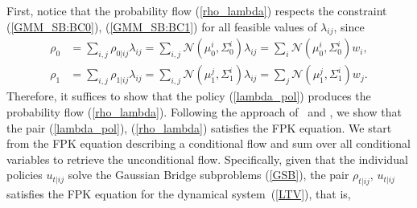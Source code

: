 \documentclass[twoside]{article}
\renewcommand{\eqref}[1]{(\ref{#1})}
\newcommand{\N}{\mathcal{N}}
\begin{document}
First, notice that the probability flow \eqref{rho_lambda} respects the constraint \eqref{GMM_SB:BC0}, \eqref{GMM_SB:BC1} for all feasible values of $\lambda_{ij}$, since 
\begin{subequations}
\begin{align}
    \rho_0 &= \sum_{i,j} \rho_{0|ij} \lambda_{ij} = \sum_{i,j} \N(\mu^i_0, \Sigma_0^i) \lambda_{ij} = \sum_{i} \N(\mu^i_0, \Sigma_0^i) w_i,\\
    \rho_1 &= \sum_{i,j} \rho_{1|ij} \lambda_{ij} = \sum_{i,j} \N(\mu^j_1, \Sigma_1^i) \lambda_{ij} = \sum_{j} \N(\mu^j_1, \Sigma_1^i) w_j.
\end{align}
\end{subequations}
%
Therefore, it suffices to show that the policy \eqref{lambda_pol} produces the probability flow \eqref{rho_lambda}.
Following the approach of~\cite{lipman2022flow} and \cite{liu2024generalized}, we show that the pair \eqref{lambda_pol}, \eqref{rho_lambda} satisfies the FPK equation.
We start from the FPK equation describing a conditional flow and sum over all conditional variables to retrieve the unconditional flow. 
%
Specifically, given that the individual policies $u_{t|ij}$ solve the Gaussian Bridge subproblems \eqref{GSB}, the pair $\rho_{t|ij}, \, u_{t|ij}$ satisfies the FPK equation for the dynamical system~\eqref{LTV}, that is,
%
\end{document}
